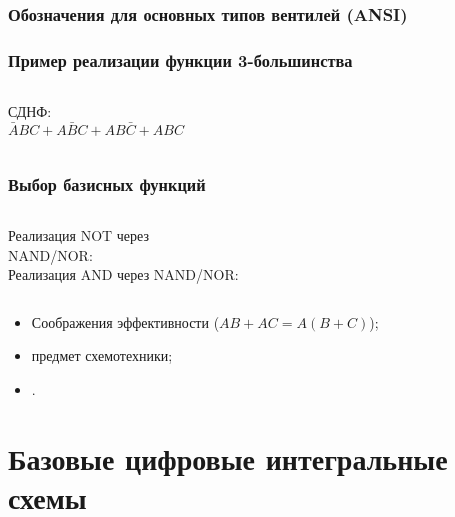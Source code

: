 \begin{frame}
\frametitle{Обозначения для основных типов вентилей (ANSI)}
\pause
{}
\end{frame}

\begin{frame}[plain]
\frametitle{Пример реализации функции 3-большинства}
\pause\begin{columns}
    \column{3.5cm} 
    \pause СДНФ:\\\small$\bar A BC + A \bar B C + AB \bar C + ABC$
    \column{8cm}\pause \vspace{-.2cm}
\end{columns}
\end{frame}

\begin{frame}
\frametitle{Выбор базисных функций}

\vspace{1cm}\pause

\begin{columns}
    \column{5cm} Реализация NOT через\\NAND/NOR:\\
    \column{6cm} Реализация AND через NAND/NOR:\\
\end{columns}

\pause\begin{itemize}
    \item Соображения эффективности ($AB + AC = A(B+C)$);
    \item предмет схемотехники;
    \item {}.
\end{itemize}
\end{frame}

\section {Базовые цифровые интегральные схемы}

